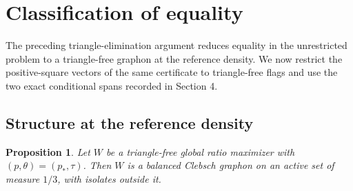 \documentclass[11pt]{amsart}
\newtheorem{proposition}[theorem]{Proposition}
\theoremstyle{definition}
\theoremstyle{remark}
\begin{document}
\section{Classification of equality}
\label{sec:equality}

The preceding triangle-elimination argument reduces equality in the
unrestricted problem to a triangle-free graphon at the reference density.
We now restrict the positive-square vectors of the same certificate to
triangle-free flags and use the two exact conditional spans recorded in
Section 4.

\subsection{Structure at the reference density}

\begin{proposition}\label{prop:reference-equality}
Let $W$ be a triangle-free global ratio maximizer with
$(p,\theta)=(p_\ast,\tau)$. Then $W$ is a balanced Clebsch graphon on an
active set of measure $1/3$, with isolates outside it.
\end{proposition}
\end{document}
